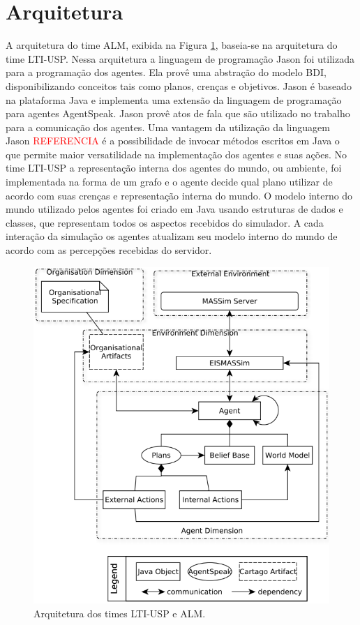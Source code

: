 \documentclass{llncs}
\begin{document}
\section{Arquitetura}

A arquitetura do time ALM, exibida na Figura \ref{fig:arquitetura}, baseia-se na arquitetura do time LTI-USP. Nessa arquitetura a linguagem de programação Jason foi utilizada para a programação dos agentes. Ela provê uma abstração do modelo BDI, disponibilizando conceitos tais como planos, crenças e objetivos. Jason é baseado na plataforma Java e implementa uma extensão da linguagem de programação para agentes AgentSpeak. Jason provê atos de fala que são utilizado no trabalho para a comunicação dos agentes. Uma vantagem da utilização da linguagem Jason \textcolor{red}{REFERENCIA} é a possibilidade de invocar métodos escritos em Java o que permite maior versatilidade na implementação dos agentes e suas ações. No time LTI-USP a representação interna dos agentes do mundo, ou ambiente, foi implementada na forma de um grafo e o agente decide qual plano utilizar de acordo com suas crenças e representação interna do mundo. O modelo interno do mundo utilizado pelos agentes foi criado em Java usando estruturas de dados e classes, que representam todos os aspectos recebidos do simulador. A cada interação da simulação os agentes atualizam seu modelo interno do mundo de acordo com as percepções recebidas do servidor.

\begin{figure}[!ht]
\centering
\includegraphics[width=0.7\linewidth]{./images/arquitetura.png}
\caption{Arquitetura dos times LTI-USP e ALM.}
\label{fig:arquitetura}
\end{figure}
\end{document}
